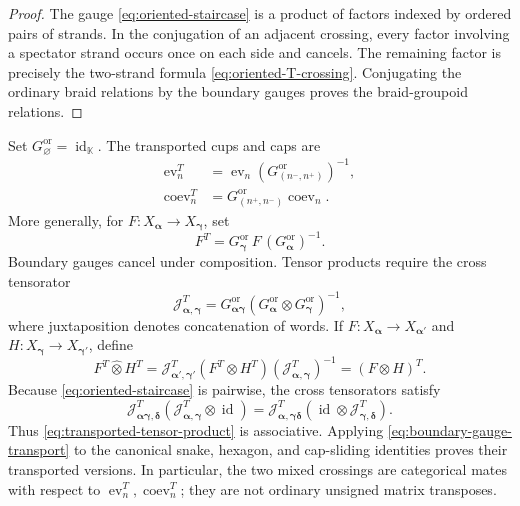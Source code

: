 \documentclass[11pt,a4paper]{article}
\newcommand{\hK}{\mathbb K}
\newcommand{\ot}{\otimes}
\newcommand{\id}{\operatorname{id}}
\newcommand{\ev}{\operatorname{ev}}
\newcommand{\coev}{\operatorname{coev}}
\theoremstyle{definition}
\theoremstyle{remark}
\begin{document}
\begin{proof}
The gauge \eqref{eq:oriented-staircase} is a product of factors indexed
by ordered pairs of strands.  In the conjugation of an adjacent
crossing, every factor involving a spectator strand occurs once on each
side and cancels.  The remaining factor is precisely the two-strand
formula \eqref{eq:oriented-T-crossing}.  Conjugating the ordinary braid
relations by the boundary gauges proves the braid-groupoid relations.
\end{proof}

Set \(G_\varnothing^{\mathrm{or}}=\id_{\hK}\).  The transported cups and
caps are
\begin{equation}\label{eq:transported-cups}
\begin{aligned}
 \ev_n^T&=\ev_n(G_{(n^-,n^+)}^{\mathrm{or}})^{-1},\\
 \coev_n^T&=G_{(n^+,n^-)}^{\mathrm{or}}\coev_n.
\end{aligned}
\end{equation}
More generally, for
\(F:X_{\boldsymbol\alpha}\to X_{\boldsymbol\gamma}\), set
\begin{equation}\label{eq:boundary-gauge-transport}
 F^T
 =
 G_{\boldsymbol\gamma}^{\mathrm{or}}\,
 F\,
 (G_{\boldsymbol\alpha}^{\mathrm{or}})^{-1}.
\end{equation}
Boundary gauges cancel under composition.  Tensor products require the
cross tensorator
\begin{equation}\label{eq:cross-tensorator}
 \mathcal J_{\boldsymbol\alpha,\boldsymbol\gamma}^{T}
 =
 G_{\boldsymbol\alpha\boldsymbol\gamma}^{\mathrm{or}}
 \left(
 G_{\boldsymbol\alpha}^{\mathrm{or}}
 \ot G_{\boldsymbol\gamma}^{\mathrm{or}}
 \right)^{-1},
\end{equation}
where juxtaposition denotes concatenation of words.  If
\(F:X_{\boldsymbol\alpha}\to X_{\boldsymbol\alpha'}\) and
\(H:X_{\boldsymbol\gamma}\to X_{\boldsymbol\gamma'}\), define
\begin{equation}\label{eq:transported-tensor-product}
 F^T\widehat\ot H^T
 =
 \mathcal J_{\boldsymbol\alpha',\boldsymbol\gamma'}^T
 (F^T\ot H^T)
 (\mathcal J_{\boldsymbol\alpha,\boldsymbol\gamma}^T)^{-1}
 =(F\ot H)^T.
\end{equation}
Because \eqref{eq:oriented-staircase} is pairwise, the cross tensorators
satisfy
\[
\mathcal J_{\boldsymbol\alpha\boldsymbol\gamma,\boldsymbol\delta}^T
(\mathcal J_{\boldsymbol\alpha,\boldsymbol\gamma}^T\ot\id)
=
\mathcal J_{\boldsymbol\alpha,\boldsymbol\gamma\boldsymbol\delta}^T
(\id\ot\mathcal J_{\boldsymbol\gamma,\boldsymbol\delta}^T).
\]
Thus \eqref{eq:transported-tensor-product} is associative.  Applying
\eqref{eq:boundary-gauge-transport} to the canonical snake, hexagon, and
cap-sliding identities proves their transported versions.  In
particular, the two mixed crossings are categorical mates with respect
to \(\ev_n^T,\coev_n^T\); they are not ordinary unsigned matrix
transposes.
\end{document}
